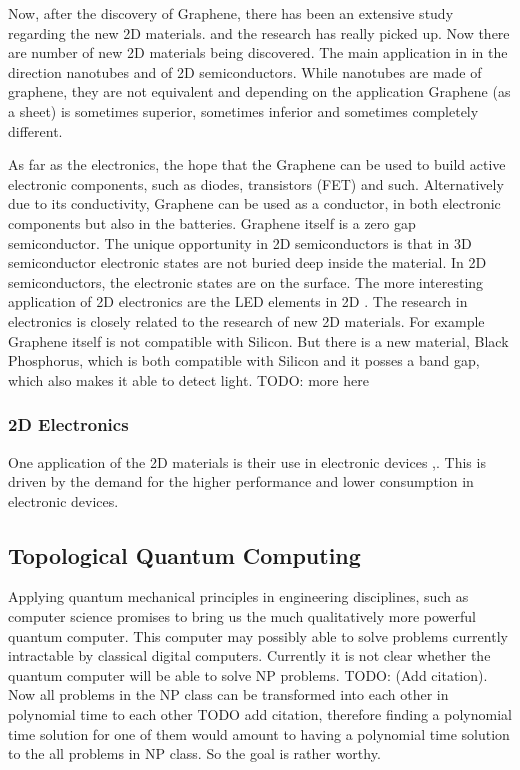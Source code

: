 Now, after the discovery of Graphene, there has been an extensive study regarding the new 2D materials. and the research has really picked up. Now there are number of new 2D materials being discovered.  The main application in in the direction nanotubes and of 2D semiconductors. While nanotubes are made of graphene, they are not equivalent and depending on the application Graphene (as a sheet) is sometimes superior, sometimes inferior and sometimes completely different.

As far as the electronics, the hope that the Graphene can be used to build active electronic components, such as diodes, transistors (FET) and such. Alternatively due to its conductivity, Graphene can be used as a conductor, in both electronic components but also in the batteries. Graphene itself is a zero gap semiconductor. The unique opportunity in 2D semiconductors is that in 3D semiconductor electronic states are not buried deep inside the material. In 2D semiconductors, the electronic states are on the surface. The more interesting application of 2D electronics are the LED elements in 2D \cite{2DLED}. The research in electronics is closely related to the research of new 2D materials. For example Graphene itself is not compatible with Silicon. But there is a new material, Black Phosphorus, which is both compatible with Silicon and it posses a band gap, which also makes it able to detect light. TODO: more here

\subsubsection*{2D Electronics}

One application of the 2D materials is their use in electronic devices \cite{2DEJour1},\cite{2DEJour2}. This is driven by the demand for the higher performance and lower consumption in electronic devices.

\subsection*{Topological Quantum Computing}

Applying quantum mechanical principles in engineering disciplines, such as computer science \cite{FQC} promises to bring us the much qualitatively more powerful quantum computer. This computer may possibly able to solve problems currently intractable by classical digital computers. Currently it is not clear whether the quantum computer will be able to solve NP problems. TODO: (Add citation). Now all problems in the NP class can be transformed into each other in polynomial time to each other TODO add citation,  therefore finding a polynomial time solution for one of them would amount to having a polynomial time solution to the all problems in NP class. So the goal is rather worthy.

